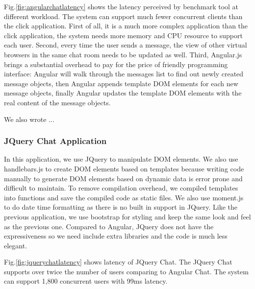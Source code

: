 Fig.\ref{fig:angularchatlatency} shows the latency perceived by benchmark tool
at different workload.
The system can support much fewer concurrent clients than the click application.
First of all, it is a much more complex application than the click application,
the system needs more memory and CPU resource to support each user.
Second, every time the user sends a message, the view of other virtual browsers
in the same chat room needs to be updated as well.
Third, Angular.js brings a substantial overhead 
to pay for the price of friendly programming interface: %
Angular will walk through the messages list to find out newly created
message objects,
then Angular appends template DOM elements for each new message objects,
finally Angular updates the template DOM elements with the real content of the 
message objects.

We also wrote ...

\angularchatlatency{}

\subsubsection{JQuery Chat Application}
\label{sec:jquery}
In this application, we use JQuery to manipulate DOM elements.
We also use handlebars.js to create DOM elements based on templates
because writing code manually to generate DOM elements based on dynamic data 
is error prone and difficult to maintain.
To remove compilation overhead, 
we compiled templates into \js{} functions and save the compiled code as static files.
We also use moment.js to do date time formatting as there is no built in support 
in JQuery.
Like the previous application, we use bootstrap for styling and keep the same look
and feel as the previous one.
Compared to Angular, JQuery does not have the expressiveness so we need include 
extra libraries and the code is much less elegant. %

Fig.\ref{fig:jquerychatlatency} shows latency of JQuery Chat.
The JQuery Chat supports over twice the number of users comparing to Angular Chat.
The system can support 1,800 concurrent users with 99ms latency.

\jquerychatlatency{}


